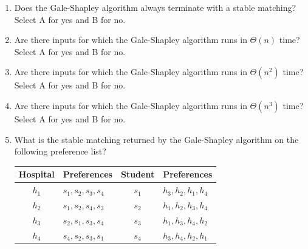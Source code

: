 \documentclass[11pt]{article}
\begin{document}
\begin{enumerate}
The following questions refer to the Gale-Shapley algorithm for
stable matching.

    \begin{algo}
    Gale-Shapley(preference lists for $n$ hospitals and $n$ students)\+\\
    Let $M$ be an empty matching\\
    While some hospital $h$ is umatched and hasn't proposed to every student:\+ \\
        Let $s$ be the first student on $h$'s list to whom $h$ has not yet proposed\\
        If $s$ is unmatched:\+\\
            Add $(h,s)$ to $M$\-\\
        Else $s$ is matched to $h'$:\+\\
            If $s$ prefers $h$ to $h'$:\+\\
                Remove $(h',s)$ from $M$\\
                Add $(h,s)$ to $M$\-\\
            Else $s$ prefers $h'$ to $h$:\+\\
                Do nothing\-\-\-\\
    Return $M$\\
    \end{algo}

\item Does the Gale-Shapley algorithm always terminate with a stable matching?
Select A for yes and B for no.

\item Are there inputs for which the Gale-Shapley algorithm runs in $\Theta(n)$ time?
Select A for yes and B for no.

\item Are there inputs for which the Gale-Shapley algorithm runs in $\Theta(n^2)$ time?
Select A for yes and B for no.

\item Are there inputs for which the Gale-Shapley algorithm runs in $\Theta(n^3)$ time?
Select A for yes and B for no.

\item What is the stable matching returned by the Gale-Shapley algorithm on the
following preference list?

\begin{table}[h]
\centering
\begin{tabular}{c | l || c | l}
\textbf{Hospital} & \textbf{Preferences} & \textbf{Student} & \textbf{Preferences} \\
\hline
$h_1$ & $s_1 , s_2 , s_3 , s_4$ & $s_1$ & $h_3 , h_2 , h_1 , h_4$ \\
$h_2$ & $s_1 , s_2 , s_4 , s_3$ & $s_2$ & $h_1 , h_2 , h_3 , h_4$ \\
$h_3$ & $s_2 , s_1 , s_3 , s_4$ & $s_3$ & $h_1 , h_3 , h_4 , h_2$ \\
$h_4$ & $s_4 , s_2 , s_3 , s_1$ & $s_4$ & $h_3 , h_4 , h_2 , h_1$ \\
\end{tabular}
\end{table}


\end{enumerate}
\end{document}
